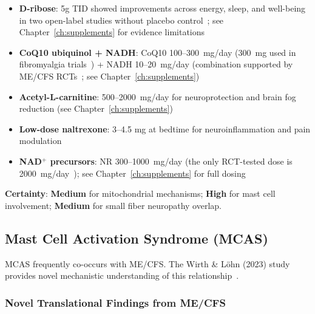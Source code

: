\begin{itemize}
    \item \textbf{D-ribose}: 5g TID showed improvements across energy, sleep, and well-being in two open-label studies without placebo control~\cite{Teitelbaum2006ribose,Teitelbaum2012ribose}; see Chapter~\ref{ch:supplements} for evidence limitations
    \item \textbf{CoQ10 ubiquinol + NADH}: CoQ10 100--300~mg/day (300~mg used in fibromyalgia trials~\cite{Cordero2013}) + NADH 10--20~mg/day (combination supported by ME/CFS RCTs~\cite{CastroMarrero2021fatigue}; see Chapter~\ref{ch:supplements})
    \item \textbf{Acetyl-L-carnitine}: 500--2000~mg/day for neuroprotection and brain fog reduction (see Chapter~\ref{ch:supplements})
    \item \textbf{Low-dose naltrexone}: 3--4.5 mg at bedtime for neuroinflammation and pain modulation
    \item \textbf{NAD$^+$ precursors}: NR 300--1000~mg/day (the only RCT-tested dose is 2000~mg/day~\cite{Wu2025NRLongCOVID}); see Chapter~\ref{ch:supplements} for full dosing
\end{itemize}

\textbf{Certainty}: \textbf{Medium} for mitochondrial mechanisms; \textbf{High} for mast cell involvement; \textbf{Medium} for small fiber neuropathy overlap.

\subsection{Mast Cell Activation Syndrome (MCAS)}
\label{sec:mcas-translational}

MCAS frequently co-occurs with ME/CFS. The Wirth \& Löhn (2023) study provides novel mechanistic understanding of this relationship~\cite{Wirth2023}.

\subsubsection{Novel Translational Findings from ME/CFS}

